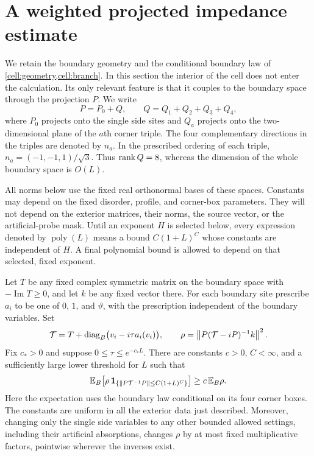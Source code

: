 \section{A weighted projected impedance estimate}
\label{sec:impedance}

We retain the boundary geometry and the conditional boundary law of
\cref{cell:geometry,cell:branch}. In this section the interior of the cell
does not enter the calculation. Its only relevant feature is that it
couples to the boundary space through the projection $P$. We write
\[
 P=P_0+Q,
 \qquad Q=Q_1+Q_2+Q_3+Q_4,
\]
where $P_0$ projects onto the single side sites and $Q_a$ projects onto the
two-dimensional plane of the $a$th corner triple. The four complementary
directions in the triples are denoted by $n_a$. In the prescribed ordering
of each triple, $n_a=(-1,-1,1)/\sqrt3$. Thus $\operatorname{rank} Q=8$, whereas the
dimension of the whole boundary space is $O(L)$.

All norms below use the fixed real orthonormal bases of these spaces.
Constants may depend on the fixed disorder, profile, and corner-box
parameters. They will not depend on the exterior matrices, their norms,
the source vector, or the artificial-probe mask. Until an exponent $H$
is selected below, every expression denoted by $\operatorname{poly}(L)$
means a bound $C(1+L)^C$ whose constants are independent of $H$. A final
polynomial bound is allowed to depend on that selected, fixed exponent.

\begin{proposition}
\label{imp:weighted}
Let $T$ be any fixed complex symmetric matrix on the boundary space with
$-\operatorname{Im}T\ge0$, and let $k$ be any fixed vector there. For each
boundary site prescribe $a_i$ to be one of $0$, $1$, and $\vartheta$, with
the prescription independent of the boundary variables. Set
\begin{equation}
 \mathcal T=T+\operatorname{diag}_B\bigl(v_i-i\tau a_i(v_i)\bigr),
 \qquad
 \rho=\left\lVert P(\mathcal T-iP)^{-1}k\right\rVert^2.
 \label{imp:rho}
\end{equation}
Fix $c_*>0$ and suppose $0\le\tau\le e^{-c_*L}$. There are constants
$c>0$, $C<\infty$, and a sufficiently large lower threshold for $L$ such
that
\begin{equation}
 \mathbb E_B\!\left[
   \rho\,\mathbf 1_{\{\left\lVert P\mathcal T^{-1}P\right\rVert\le C(1+L)^C\}}
 \right]
 \ge c\,\mathbb E_B\rho.
 \label{imp:weighted-estimate}
\end{equation}
Here the expectation uses the boundary law conditional on its four
corner boxes. The constants are uniform in all the exterior data just
described. Moreover, changing only the single side variables to any other
bounded allowed settings, including their artificial absorptions,
changes $\rho$ by at most fixed multiplicative factors, pointwise wherever
the inverses exist.
\end{proposition}

